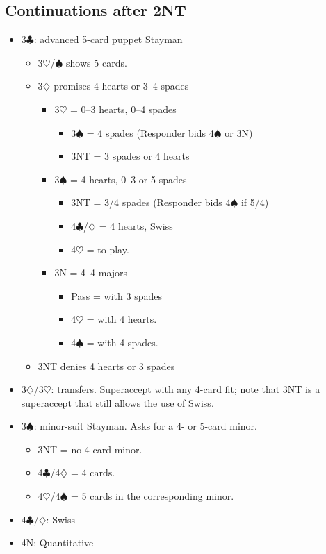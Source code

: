 \documentclass[a4paper,14pt]{extarticle}
\begin{document}
\newpage

\subsection{Continuations after 2NT}
\label{sec:resp:2n}

\begin{itemize}
\item 3$\clubsuit$: advanced 5-card puppet Stayman
	\begin{itemize}
   \item 3$\heartsuit$/$\spadesuit$ shows 5 cards.
   \item 3$\diamondsuit$ promises 4 hearts or 3--4 spades
		\begin{itemize}
      \item 3$\heartsuit$ = 0--3 hearts, 0--4 spades
			\begin{itemize}
         \item 3$\spadesuit$ = 4 spades (Responder bids 4$\spadesuit$ or 3N)
         \item 3NT = 3 spades or 4 hearts
			\end{itemize}
      \item 3$\spadesuit$ = 4 hearts, 0--3 or 5 spades
			\begin{itemize}
         \item 3NT = 3/4 spades (Responder bids 4$\spadesuit$ if 5/4)
         \item 4$\clubsuit$/$\diamondsuit$ = 4 hearts, Swiss 
         \item 4$\heartsuit$ = to play.
			\end{itemize}
      \item 3N = 4--4 majors
			\begin{itemize}
			\item Pass = with 3 spades
         \item 4$\heartsuit$ = with 4 hearts.
         \item 4$\spadesuit$ = with 4 spades.
			\end{itemize}
		\end{itemize}
   \item 3NT denies 4 hearts or 3 spades
	\end{itemize}

\item 3$\diamondsuit$/3$\heartsuit$: transfers.  Superaccept with any 4-card fit; note that 3NT is a
superaccept that still allows the use of Swiss.

\item 3$\spadesuit$: minor-suit Stayman.  Asks for a 4- or 5-card minor.
	\begin{itemize}
   \item 3NT = no 4-card minor.
   \item 4$\clubsuit$/4$\diamondsuit$ = 4 cards.
   \item 4$\heartsuit$/4$\spadesuit$ = 5 cards in the corresponding minor.
	\end{itemize}

\item 4$\clubsuit$/$\diamondsuit$: Swiss 
\item 4N: Quantitative
\end{itemize}
\end{document}
